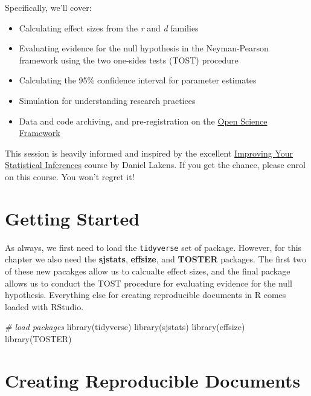 \documentclass[
]{book}
\newenvironment{Shaded}{\begin{snugshade}}{\end{snugshade}}
\newcommand{\CommentTok}[1]{\textcolor[rgb]{0.56,0.35,0.01}{\textit{#1}}}
\newcommand{\FunctionTok}[1]{\textcolor[rgb]{0.00,0.00,0.00}{#1}}
\newcommand{\NormalTok}[1]{#1}
\providecommand{\tightlist}{%
  \setlength{\itemsep}{0pt}\setlength{\parskip}{0pt}}
\begin{document}
Specifically, we'll cover:

\begin{itemize}
\tightlist
\item
  Calculating effect sizes from the \emph{r} and \emph{d} families
\item
  Evaluating evidence for the null hypothesis in the Neyman-Pearson framework using the two one-sides tests (TOST) procedure
\item
  Calculating the 95\% confidence interval for parameter estimates
\item
  Simulation for understanding research practices
\item
  Data and code archiving, and pre-registration on the \href{https://osf.io/}{Open Science Framework}
\end{itemize}

This session is heavily informed and inspired by the excellent \href{https://www.coursera.org/learn/statistical-inferences}{Improving Your Statistical Inferences} course by Daniel Lakens. If you get the chance, please enrol on this course. You won't regret it!

\hypertarget{getting-started-7}{%
\section{Getting Started}\label{getting-started-7}}

As always, we first need to load the \texttt{tidyverse} set of package. However, for this chapter we also need the \textbf{sjstats}, \textbf{effsize}, and \textbf{TOSTER} packages. The first two of these new pacakges allow us to calcualte effect sizes, and the final package allows us to conduct the TOST procedure for evaluating evidence for the null hypothesis. Everything else for creating reproducible documents in R comes loaded with RStudio.

\begin{Shaded}
\begin{Highlighting}[]
\CommentTok{\# load packages}
\FunctionTok{library}\NormalTok{(tidyverse)}
\FunctionTok{library}\NormalTok{(sjstats)}
\FunctionTok{library}\NormalTok{(effsize)}
\FunctionTok{library}\NormalTok{(TOSTER)}
\end{Highlighting}
\end{Shaded}

\hypertarget{creating-reproducible-documents}{%
\section{Creating Reproducible Documents}\label{creating-reproducible-documents}}
\end{document}

